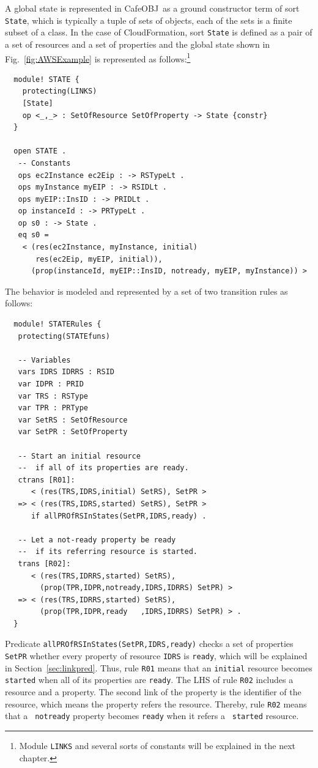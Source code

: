\documentclass[12pt]{report}
\newcommand{\stt}[1]{{\small{\tt {#1}}}}
\newcommand{\cafeobj}{{\sf CafeOBJ}~}
\begin{document}
A global state is represented in \cafeobj as a ground constructor term
of sort {\tt State}, which is typically a tuple of sets of objects,
each of the sets is a finite subset of a class.  In the case of
CloudFormation, sort {\tt State} is defined as a pair of a set of
resources and a set of properties and the global state shown in
Fig.~\ref{fig:AWSExample} is represented as follows:\footnote{Module
  {\tt LINKS} and several sorts of constants will be explained in the
  next chapter.}
\small
\begin{verbatim}
  module! STATE {
    protecting(LINKS)
    [State]
    op <_,_> : SetOfResource SetOfProperty -> State {constr}
  }
  
  open STATE . 
   -- Constants
   ops ec2Instance ec2Eip : -> RSTypeLt .
   ops myInstance myEIP : -> RSIDLt .
   ops myEIP::InsID : -> PRIDLt .
   op instanceId : -> PRTypeLt .
   op s0 : -> State .
   eq s0 =
    < (res(ec2Instance, myInstance, initial) 
       res(ec2Eip, myEIP, initial)),
      (prop(instanceId, myEIP::InsID, notready, myEIP, myInstance)) >
\end{verbatim}
\normalsize
The behavior is modeled and represented by a set of two transition
rules as follows:
\small
\begin{verbatim}
  module! STATERules {
   protecting(STATEfuns)
  
   -- Variables
   vars IDRS IDRRS : RSID 
   var IDPR : PRID
   var TRS : RSType
   var TPR : PRType
   var SetRS : SetOfResource
   var SetPR : SetOfProperty
  
   -- Start an initial resource
   --  if all of its properties are ready.
   ctrans [R01]:
      < (res(TRS,IDRS,initial) SetRS), SetPR >
   => < (res(TRS,IDRS,started) SetRS), SetPR > 
      if allPROfRSInStates(SetPR,IDRS,ready) .
  
   -- Let a not-ready property be ready 
   --  if its referring resource is started.
   trans [R02]:
      < (res(TRS,IDRRS,started) SetRS), 
        (prop(TPR,IDPR,notready,IDRS,IDRRS) SetPR) >
   => < (res(TRS,IDRRS,started) SetRS), 
        (prop(TPR,IDPR,ready   ,IDRS,IDRRS) SetPR) > .
  }
\end{verbatim}
\normalsize
Predicate \stt{allPROfRSInStates(SetPR,IDRS,ready)} checks a set of
properties {\tt SetPR} whether every property of resource {\tt IDRS}
is {\tt ready}, which will be explained in Section~\ref{sec:linkpred}.
Thus, rule {\tt R01} means that an {\tt initial} resource becomes {\tt
  started} when all of its properties are {\tt ready}.  The LHS of
rule {\tt R02} includes a resource and a property.  The second link of
the property is the identifier of the resource, which means the
property refers the resource.  Thereby, rule {\tt R02} means that a {\tt
  notready} property becomes {\tt ready} when it refers a {\tt
  started} resource.
\end{document}
